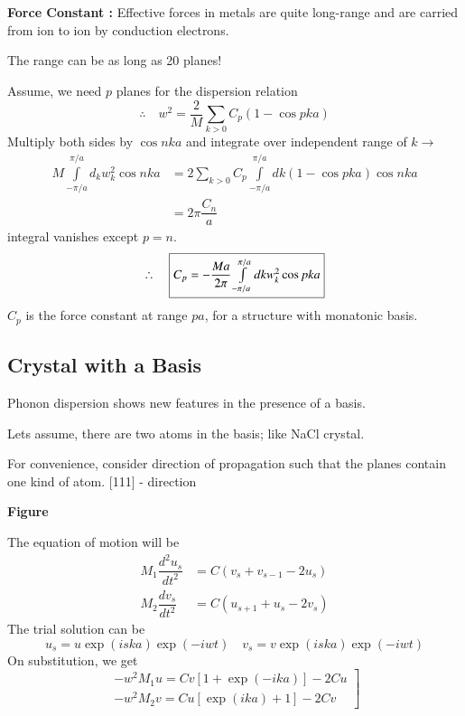 \chapter[Lecture 18]{}\label{lec18}

{\bf Force Constant :} Effective forces in metals are quite long-range and are carried from ion to ion by conduction electrons.

The range can be as long as 20 planes!

Assume, we need $p$ planes for the dispersion relation
$$
\therefore\quad w^{2}=\dfrac{2}{M}\sum\limits_{k>0}C_{p}(1-\cos pka)
$$
Multiply both sides by $\cos nka$ and integrate over independent range of $k\to$
\begin{align*}
M\int\limits^{\pi/a}_{-\pi/a}d_{k}w^{2}_{k}\cos nka &= 2\sum\limits_{k>0}C_{p}\int\limits^{\pi/a}_{-\pi/a}dk(1-\cos pka)\cos nka\\
&= 2\pi \dfrac{C_{n}}{a}
\end{align*}
integral vanishes except $p=n$.
$$
\therefore\quad \fbox{$C_{p}=-\dfrac{Ma}{2\pi}\int\limits^{\pi/a}_{-\pi/a}dk w^{2}_{k}\cos pka$}
$$
$C_{p}$ is the force constant at range $pa$, for a structure with monatonic basis.

\section*{Crystal with a Basis}

Phonon dispersion shows new features in the presence of a basis.

Lets assume, there are two atoms in the basis; like NaCl crystal.

For convenience, consider direction of propagation such that the planes contain one kind of atom. [111] - direction 
\begin{center}
{\bf Figure}
\end{center}
The equation of motion will be
\begin{align*}
M_{1}\dfrac{d^{2}u_{s}}{dt^{2}} &= C(v_{s}+v_{s-1}-2u_{s})\\
M_{2}\dfrac{dv_{s}}{dt^{2}} &= C(u_{s+1}+u_{s}-2v_{s})
\end{align*}
The trial solution can be
$$
u_{s}=u\exp (iska) \exp (-iwt)\quad v_{s}=v\exp (iska)\exp(-iwt)
$$
On substitution, we get
\begin{equation*}
\left.
\begin{array}{l}
-w^{2}M_{1}u = Cv[1+\exp(-ika)]-2Cu\\
-w^{2}M_{2}v=Cu[\exp(ika)+1]-2Cv
\end{array}\right]\tag{A}\label{lec18-eqA}
\end{equation*}

